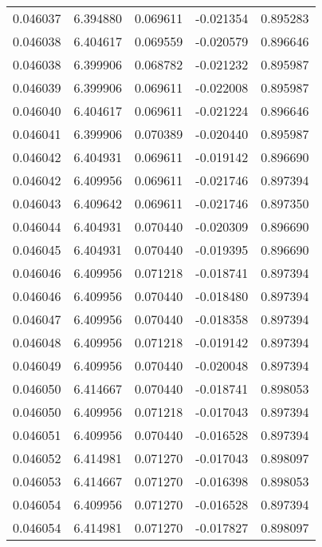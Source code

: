 \begin{tabular}{lrrrr}
0.046037    &  6.394880 &  0.069611 & -0.021354 &             0.895283 \\
0.046038    &  6.404617 &  0.069559 & -0.020579 &             0.896646 \\
0.046038    &  6.399906 &  0.068782 & -0.021232 &             0.895987 \\
0.046039    &  6.399906 &  0.069611 & -0.022008 &             0.895987 \\
0.046040    &  6.404617 &  0.069611 & -0.021224 &             0.896646 \\
0.046041    &  6.399906 &  0.070389 & -0.020440 &             0.895987 \\
0.046042    &  6.404931 &  0.069611 & -0.019142 &             0.896690 \\
0.046042    &  6.409956 &  0.069611 & -0.021746 &             0.897394 \\
0.046043    &  6.409642 &  0.069611 & -0.021746 &             0.897350 \\
0.046044    &  6.404931 &  0.070440 & -0.020309 &             0.896690 \\
0.046045    &  6.404931 &  0.070440 & -0.019395 &             0.896690 \\
0.046046    &  6.409956 &  0.071218 & -0.018741 &             0.897394 \\
0.046046    &  6.409956 &  0.070440 & -0.018480 &             0.897394 \\
0.046047    &  6.409956 &  0.070440 & -0.018358 &             0.897394 \\
0.046048    &  6.409956 &  0.071218 & -0.019142 &             0.897394 \\
0.046049    &  6.409956 &  0.070440 & -0.020048 &             0.897394 \\
0.046050    &  6.414667 &  0.070440 & -0.018741 &             0.898053 \\
0.046050    &  6.409956 &  0.071218 & -0.017043 &             0.897394 \\
0.046051    &  6.409956 &  0.070440 & -0.016528 &             0.897394 \\
0.046052    &  6.414981 &  0.071270 & -0.017043 &             0.898097 \\
0.046053    &  6.414667 &  0.071270 & -0.016398 &             0.898053 \\
0.046054    &  6.409956 &  0.071270 & -0.016528 &             0.897394 \\
0.046054    &  6.414981 &  0.071270 & -0.017827 &             0.898097 \\

\end{tabular}
